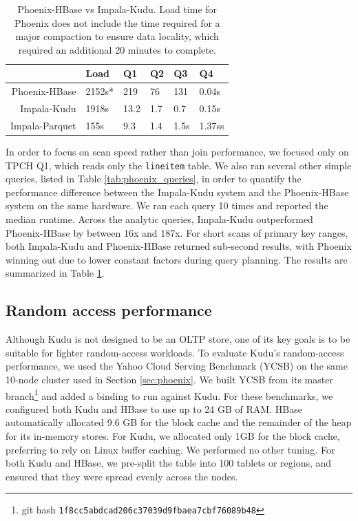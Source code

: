 \documentclass{vldb}
\begin{document}
\begin{table}
\begin{tabular}{r|lllll}
              & Load   &  Q1  &  Q2 &  Q3  &  Q4\\\hline
Phoenix-HBase & 2152s* & 219  & 76  & 131  & 0.04s\\
Impala-Kudu   & 1918s  & 13.2 & 1.7 & 0.7  & 0.15s\\
Impala-Parquet& 155s   & 9.3  & 1.4 & 1.5s  & 1.37ss
\end{tabular}
\caption{Phoenix-HBase vs Impala-Kudu. Load time for Phoenix does not include the time required for a major compaction to
ensure data locality, which required an additional 20 minutes to complete.}
\label{tab:phoenix_results}
\end{table}

In order to focus on scan speed rather than join performance, we focused only on TPCH Q1, which
reads only the {\tt lineitem} table. We also ran several other simple queries, listed in
Table \ref{tab:phoenix_queries}, in order to quantify the performance difference between
the Impala-Kudu system and the Phoenix-HBase system on the same hardware. We ran each
query 10 times and reported the median runtime. Across the analytic queries, Impala-Kudu
outperformed Phoenix-HBase by between 16x and 187x. For short scans of primary key
ranges, both Impala-Kudu and Phoenix-HBase returned sub-second results, with Phoenix winning
out due to lower constant factors during query planning. The results are summarized in
Table \ref{tab:phoenix_results}.

\subsection{Random access performance}

Although Kudu is not designed to be an OLTP store, one of its key goals is to be suitable for
lighter random-access workloads. To evaluate Kudu's random-access performance, we used
the Yahoo Cloud Serving Benchmark (YCSB)\cite{ycsb} on the same 10-node cluster used in
Section \ref{sec:phoenix}. We built YCSB from its master
branch\footnote{git hash {\tt 1f8cc5abdcad206c37039d9fbaea7cbf76089b48}} and added a binding to
run against Kudu. For these benchmarks, we configured both Kudu and HBase to use up to
24 GB of RAM. HBase automatically allocated 9.6 GB for the block cache and the remainder of the
heap for its in-memory stores. For Kudu, we allocated only 1GB for the block cache, preferring
to rely on Linux buffer caching. We performed no other tuning. For both Kudu and HBase, we pre-split
the table into 100 tablets or regions, and ensured that they were spread evenly across
the nodes.
\end{document}

